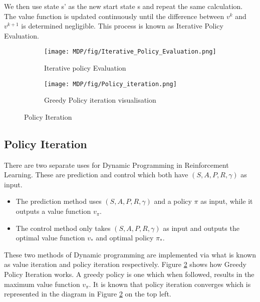 We then use state s' as the new start state s and repeat the same calculation.
The value function is updated continuously until the difference between $v^{k}$ and $v^{k+1}$ is determined negligible. This process is known as Iterative Policy Evaluation.

\begin{figure}
	\centering
	\begin{subfigure}{.49\textwidth}
		\centering
		\texttt{[image: MDP/fig/Iterative\_Policy\_Evaluation.png]}
		\caption{Iterative policy Evaluation\cite{David_Silver}}
		\label{fig:iterative_policy_evaluation}
	\end{subfigure}
	\begin{subfigure}{.49\textwidth}
		\centering
		\texttt{[image: MDP/fig/Policy\_iteration.png]}
		\caption{Greedy Policy iteration visualisation\cite{David_Silver}}
		\label{fig:greedy_policy_iteration}
	\end{subfigure}
	\caption{Policy Iteration \cite{David_Silver}}
	\label{fig:policy_iteration}
\end{figure}

\subsection{Policy Iteration}
There are two separate uses for Dynamic Programming in Reinforcement Learning. These are prediction and control which both have $(S,A,P,R,\gamma)$ as input.
\begin{itemize}
	\item The prediction method uses $(S,A,P,R,\gamma)$ and a policy $\pi$ as input, while it outputs a value function $v_\pi$.
	\item The control method only takes $(S,A,P,R,\gamma)$ as input and outputs the optimal value function $v_*$ and optimal policy $\pi_{*}$.
\end{itemize}

These two methods of Dynamic programming are implemented via what is known as value iteration and policy iteration respectively.
Figure \ref{fig:greedy_policy_iteration} shows how Greedy Policy Iteration works. A greedy policy is one which when followed, results in the maximum value function $v_\pi$. It is known that policy iteration converges which is represented in the diagram in Figure \ref{fig:greedy_policy_iteration} on the top left.\cite{sutton_barto}

